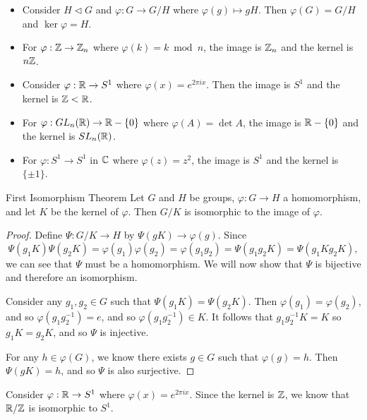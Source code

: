 \begin{exmp}\proofbreak
    \begin{itemize}
        \item Consider $H \triangleleft G$ and $\varphi: G \to G/H$ where $\varphi(g) \mapsto gH$. Then $\varphi(G) = G/H$ and $\ker \varphi = H$.
        \item For $\varphi: \mathbb{Z} \to \mathbb{Z}_n$ where $\varphi(k) = k \bmod n$, the image is $\mathbb{Z}_n$ and the kernel is $n\mathbb{Z}$.
        \item Consider $\varphi: \mathbb{R} \to S^1$ where $\varphi(x) = e^{2\pi ix}$. Then the image is $S^1$ and the kernel is $\mathbb{Z} < \mathbb{R}$.
        \item For $\varphi: GL_n(\mathbb{R}) \to \mathbb{R} - \{0\}$ where $\varphi(A) = \det A$, the image is $\mathbb{R} - \{0\}$ and the kernel is $SL_n(\mathbb{R})$.
        \item For $\varphi: S^1 \to S^1$ in $\mathbb{C}$ where $\varphi(z) = z^2$, the image is $S^1$ and the kernel is $\{\pm 1\}$.
    \end{itemize}
\end{exmp}

\begin{thm}First Isomorphism Theorem\label{first-isomorphism}\proofbreak
    Let $G$ and $H$ be groups, $\varphi: G \to H$ a homomorphism, and let $K$ be the kernel of $\varphi$. Then $G/K$ is isomorphic to the image of $\varphi$.
\end{thm}

\begin{proof}
    Define $\varPsi: G/K \to H$ by $\varPsi(gK) \to \varphi(g)$. Since \[\varPsi(g_1K)\varPsi(g_2K) = \varphi(g_1)\varphi(g_2) = \varphi(g_1g_2) = \varPsi(g_1g_2K) = \varPsi(g_1Kg_2K),\]
    we can see that $\varPsi$ must be a homomorphism. We will now show that $\varPsi$ is bijective and therefore an isomorphism.

    Consider any $g_1, g_2 \in G$ such that $\varPsi(g_1K) = \varPsi(g_2K)$. Then $\varphi(g_1) = \varphi(g_2)$, and so $\varphi(g_1g_2^{-1}) = e$, and so $\varphi(g_1g_2^{-1}) \in K$. It follows that $g_1g_2^{-1}K = K$ so $g_1K = g_2K$, and so $\varPsi$ is injective.

    For any $h \in \varphi(G)$, we know there exists $g \in G$ such that $\varphi(g) = h$. Then $\varPsi(gK) = h$, and so $\varPsi$ is also surjective.
\end{proof}

\begin{exmp}
    Consider $\varphi: \mathbb{R} \to S^1$ where $\varphi(x) = e^{2\pi ix}$. Since the kernel is $\mathbb{Z}$, we know that $\mathbb{R}/\mathbb{Z}$ is isomorphic to $S^1$.
\end{exmp}

